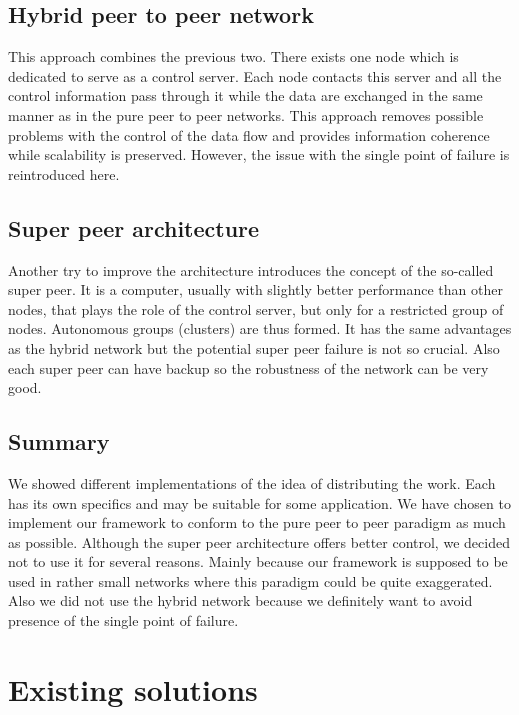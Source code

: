 \subsection*{Hybrid peer to peer network}

This approach combines the previous two. There exists one node which is
dedicated to serve as a control server. Each node contacts this server
and all the control information pass through it while the data are
exchanged in the same manner as in the pure peer to peer networks. This
approach removes possible problems with the control of the data flow and
provides information coherence while scalability is preserved. However,
the issue with the single point of failure is reintroduced here.

\subsection*{Super peer architecture}

Another try to improve the architecture introduces the concept of the
so-called super peer. It is a computer, usually with slightly better
performance than other nodes, that plays the role of the control server,
but only for a restricted group of nodes. Autonomous groups (clusters)
are thus formed. It has the same advantages as the hybrid network but
the potential super peer failure is not so crucial. Also each super peer
can have backup so the robustness of the network can be very
good.\citep{SupPeer}

\subsection{Summary}\label{summary}

We showed different implementations of the idea of distributing the
work. Each has its own specifics and may be suitable for some
application. We have chosen to implement our framework to conform to the
pure peer to peer paradigm as much as possible. Although the super peer
architecture offers better control, we decided not to use it for several
reasons. Mainly because our framework is supposed to be used in rather
small networks where this paradigm could be quite exaggerated. Also we
did not use the hybrid network because we definitely want to avoid
presence of the single point of failure.

\section{Existing solutions}\label{existing-solutions}

